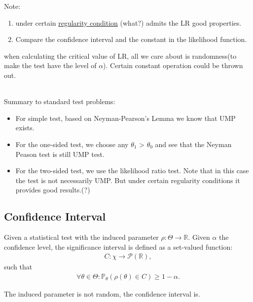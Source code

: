 \begin{remark}
Note:
\begin{enumerate}
    \item under certain \underline{regularity condition} (what?) admits the LR good properties.
    \item Compare the confidence interval and the constant in the likelihood function.
\end{enumerate}
\end{remark}

\begin{example}[t-test]
when calculating the critical value of LR, all we care about is randomness(to make the test have the level of $\alpha$). Certain constant operation could be thrown out.
\end{example}


\quad\\
Summary to standard test problems:
\begin{itemize}
    \item For simple test, based on Neyman-Pearson's Lemma we know that UMP exists.
    \item For the one-sided test, we choose any $\theta_1$ > $\theta_0$ and see that the Neyman Peason test is still UMP test.
    \item For the two-sided test, we use the likelihood ratio test. Note that in this case the test is not necessarily UMP. But under certain regularity conditions it provides good results.(?)
\end{itemize}


\subsection{Confidence Interval}
\begin{definition}
Given a statistical test with the induced parameter $\rho: \Theta \rightarrow \mathbb{R}$. Given $\alpha$ the confidence level,  the significance interval is defined as a set-valued function:
\begin{align*}
	C:\chi \rightarrow \mathcal{P}(\mathbb{R}),
\end{align*}
such that
\begin{align*}
	\forall \theta \in \Theta: \mathbb{P}_\theta(\rho(\theta) \in C) \ge 1 - \alpha. 
\end{align*}
\end{definition}
\begin{remark}
The induced parameter is not random, the confidence interval is. 	
\end{remark}







